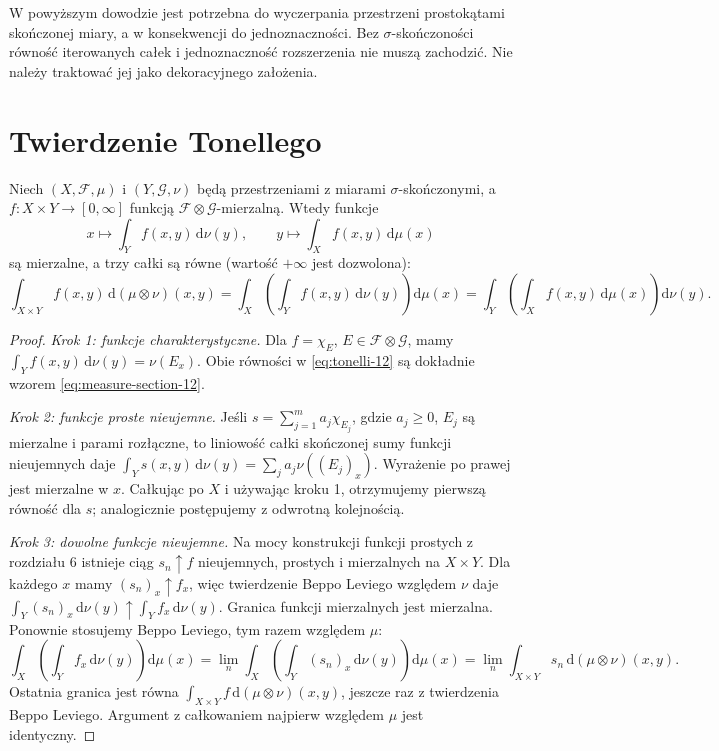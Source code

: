 \begin{uwaga}
W powyższym dowodzie jest potrzebna do
wyczerpania przestrzeni prostokątami skończonej
miary, a w konsekwencji do jednoznaczności.
Bez $\sigma$-skończoności równość iterowanych całek
i jednoznaczność rozszerzenia nie muszą zachodzić.
Nie należy traktować jej jako dekoracyjnego założenia.
\end{uwaga}

\section{Twierdzenie Tonellego}

\begin{twierdzenie}[Tonelli]
\label{thm:tonelli-12}
Niech $(X,\mathcal F,\mu)$ i $(Y,\mathcal G,\nu)$
będą przestrzeniami z miarami $\sigma$-skończonymi,
a $f:X\times Y\to[0,\infty]$ funkcją
$\mathcal F\otimes\mathcal G$-mierzalną.
Wtedy funkcje
\[
x\longmapsto\int_Y f(x,y)\,\mathrm d\nu(y),
\qquad
y\longmapsto\int_X f(x,y)\,\mathrm d\mu(x)
\]
są mierzalne, a trzy całki są równe
(wartość $+\infty$ jest dozwolona):
\begin{equation}\label{eq:tonelli-12}
\int_{X\times Y}f(x,y)\,\mathrm d(\mu\otimes\nu)(x,y)
=\int_X\left(\int_Yf(x,y)\,\mathrm d\nu(y)\right)
\mathrm d\mu(x)
=\int_Y\left(\int_Xf(x,y)\,\mathrm d\mu(x)\right)
\mathrm d\nu(y).
\end{equation}
\end{twierdzenie}
\begin{proof}
\emph{Krok 1: funkcje charakterystyczne.}
Dla $f=\chi_E$, $E\in\mathcal F\otimes\mathcal G$,
mamy $\int_Yf(x,y)\,\mathrm d\nu(y)=\nu(E_x)$.
Obie równości w \eqref{eq:tonelli-12} są dokładnie
wzorem \eqref{eq:measure-section-12}.

\emph{Krok 2: funkcje proste nieujemne.}
Jeśli $s=\sum_{j=1}^m a_j\chi_{E_j}$,
gdzie $a_j\ge0$, $E_j$ są mierzalne i parami
rozłączne, to liniowość całki skończonej sumy
funkcji nieujemnych daje
$\int_Y s(x,y)\,\mathrm d\nu(y)
=\sum_j a_j\nu((E_j)_x)$.
Wyrażenie po prawej jest mierzalne w $x$.
Całkując po $X$ i używając kroku 1,
otrzymujemy pierwszą równość dla $s$;
analogicznie postępujemy z odwrotną kolejnością.

\emph{Krok 3: dowolne funkcje nieujemne.}
Na mocy konstrukcji funkcji prostych z rozdziału 6
istnieje ciąg $s_n\uparrow f$ nieujemnych,
prostych i mierzalnych na $X\times Y$.
Dla każdego $x$ mamy $(s_n)_x\uparrow f_x$,
więc twierdzenie Beppo Leviego względem $\nu$
daje $\int_Y(s_n)_x\,\mathrm d\nu(y)\uparrow
\int_Yf_x\,\mathrm d\nu(y)$. Granica funkcji
mierzalnych jest mierzalna. Ponownie stosujemy
Beppo Leviego, tym razem względem $\mu$:
\[
\int_X\left(\int_Y f_x\,\mathrm d\nu(y)\right)\mathrm d\mu(x)
=\lim_n\int_X\left(\int_Y (s_n)_x\,\mathrm d\nu(y)\right)\mathrm d\mu(x)
=\lim_n\int_{X\times Y}s_n\,\mathrm d(\mu\otimes\nu)(x,y).
\]
Ostatnia granica jest równa
$\int_{X\times Y}f\,\mathrm d(\mu\otimes\nu)(x,y)$,
jeszcze raz z twierdzenia Beppo Leviego.
Argument z całkowaniem najpierw względem $\mu$
jest identyczny.
\end{proof}


